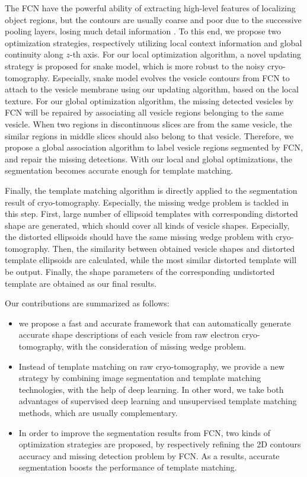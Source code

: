 The FCN have the powerful ability of extracting high-level features of localizing object regions, but the contours are usually coarse and poor due to the successive pooling layers, losing much detail information \cite{Chen2017}.
To this end, we propose two optimization strategies, respectively utilizing local context information and global continuity along $z$-th axis.
For our local optimization algorithm, a novel updating strategy is proposed for snake model, which is more robust to the noisy cryo-tomography.
Especially, snake model evolves the vesicle contours from FCN to attach to the vesicle membrane using our updating algorithm, based on the local texture.
For our global optimization algorithm, the missing detected vesicles by FCN will be repaired by associating all vesicle regions belonging to the same vesicle.
When two regions in discontinuous slices are from the same vesicle, the similar regions in middle slices should also belong to that vesicle.
Therefore, we propose a global association algorithm to label vesicle regions segmented by FCN, and repair the missing detections.
With our local and global optimizations, the segmentation becomes accurate enough for template matching.

Finally, the template matching algorithm is directly applied to the segmentation result of cryo-tomography.
Especially, the missing wedge problem is tackled in this step.
First, large number of ellipsoid templates with corresponding distorted shape are generated, which should cover all kinds of vesicle shapes.
Especially, the distorted ellipsoids should have the same missing wedge problem with cryo-tomography.
Then, the similarity between obtained vesicle shapes and distorted template ellipsoids are calculated, while the most similar distorted template will be output.
Finally, the shape parameters of the corresponding undistorted template are obtained as our final results.

Our contributions are summarized as follows:
\begin{itemize}
\item we propose a fast and accurate framework that can automatically generate accurate shape descriptions of each vesicle from raw electron cryo-tomography, with the consideration of missing wedge problem.

\item Instead of template matching on raw cryo-tomography, we provide a new strategy by combining image segmentation and template matching technologies, with the help of deep learning. In other word, we take both advantages of supervised deep learning and unsupervised template matching methods, which are usually complementary.

\item In order to improve the segmentation results from FCN, two kinds of optimization strategies are proposed, by respectively refining the 2D contours accuracy and missing detection problem by FCN. As a results, accurate segmentation boosts the performance of template matching.

\end{itemize}




